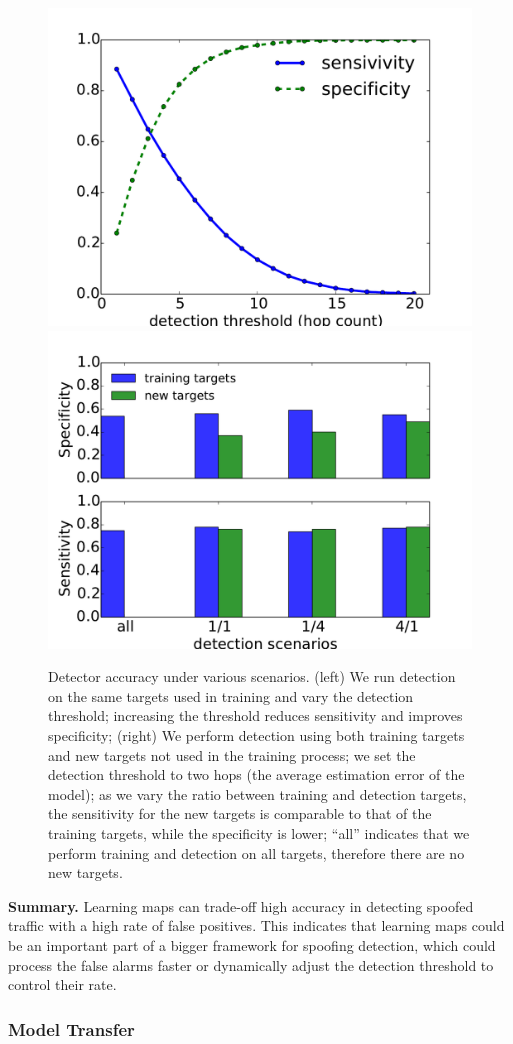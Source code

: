 \begin{figure}[t]
	\centering
	\includegraphics[width=.49\linewidth]{Graph/spoof/sens-spec-accuracy-caida-jun2015-source-to-monitor-ttls-2000files-sample10000.pdf}
	\includegraphics[width=.49\linewidth]{Graph/spoof/accuracy-bars.pdf}
	\caption{Detector accuracy under various scenarios. (left) We run detection on the  same targets used in training and vary the detection threshold; increasing the threshold reduces sensitivity and improves specificity; (right) We perform detection using both training targets and new targets not used in the training process; we set the detection threshold to two hops (the average estimation error of the model); as we vary the ratio between training and detection targets, the sensitivity for the new targets is comparable to that of the training targets, while the specificity is lower; ``all'' indicates that we perform training and detection on all targets, therefore there are no new targets.}
	\label{fig:sens}
	\vspace{0.5cm}
\end{figure}

{\bf Summary.} Learning maps can trade-off high accuracy in detecting spoofed traffic with a high rate of false positives. This indicates that learning maps could be an important part of a bigger framework for spoofing detection, which could process the false alarms faster or dynamically adjust the detection threshold to control their rate.

\subsubsection{Model Transfer} 
\label{spoof:transfer}


